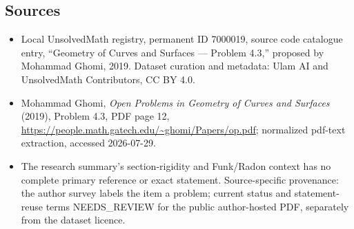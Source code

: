 \documentclass[11pt]{article}
\begin{document}
\subsection{Sources}
\begin{itemize}
\item Local UnsolvedMath registry, permanent ID 7000019, source code catalogue entry, ``Geometry of Curves and Surfaces --- Problem 4.3,'' proposed by Mohammad Ghomi, 2019. Dataset curation and metadata: Ulam AI and UnsolvedMath Contributors, CC BY 4.0.
\item Mohammad Ghomi, \emph{Open Problems in Geometry of Curves and Surfaces} (2019), Problem 4.3, PDF page 12, \url{https://people.math.gatech.edu/~ghomi/Papers/op.pdf}; normalized pdf-text extraction, accessed 2026-07-29.
\item The research summary's section-rigidity and Funk/Radon context has no complete primary reference or exact statement. Source-specific provenance: the author survey labels the item a problem; current status and statement-reuse terms NEEDS\_REVIEW for the public author-hosted PDF, separately from the dataset licence.
\end{itemize}
\end{document}
